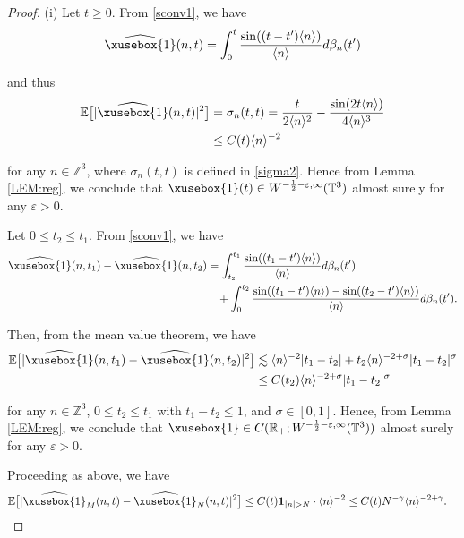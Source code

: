 \documentclass[%
11pt,  reqno]{amsart}
\def\<#1>{\xusebox{#1}}
\newcommand{\1}{\hspace{0.2mm}\text{I}\hspace{0.2mm}}
\newcommand{\noi}{\noindent}
\newcommand{\Z}{\mathbb{Z}}
\newcommand{\R}{\mathbb{R}}
\newcommand{\T}{\mathbb{T}}
\newcommand{\E}{\mathbb{E}}
\newcommand{\be}{\beta}
\newcommand{\eps}{\varepsilon}
\newcommand{\g}{\gamma}
\newcommand{\s}{\sigma}
\newcommand{\ft}{\widehat}
\newcommand{\les}{\lesssim}
\newcommand{\jb}[1]
{\langle #1 \rangle}
\newcommand{\ind}{\mathbf 1}
\numberwithin{equation}{section}
\numberwithin{theorem}{section}
\begin{document}
\begin{proof}
(i) 
Let $t \geq 0$.
From \eqref{sconv1}, we have
\begin{align}
\ft{\<1>}(n, t)   = 
   \int_0^t \frac{\sin ((t - t') \jb{ n })}{\jb{ n }} d \beta_n (t')
\label{sconv2}
\end{align}

\noi
and thus
\begin{align}
\begin{split}
\E\big[|\ft{\<1>}(n, t)|^2\big] 
& = \s_n(t, t) %
= \frac{t}{2\jb{n}^2} - \frac{\sin(2t \jb{n})}{4\jb{n}^3}\\
& \leq C(t) \jb{n}^{-2}
\end{split}
\label{sconv3}
\end{align}

\noi
for any $n \in \Z^3$, where $\s_n(t, t)$ is defined in \eqref{sigma2}.
Hence from Lemma \ref{LEM:reg}, 
we conclude that 
 $\<1>(t) \in W^{-\frac12 -\eps, \infty}(\T^3)$
 almost surely for any $\eps >0$.


Let  $0 \leq t_2 \leq t_1$. 
From \eqref{sconv1},  we have
\begin{align}
\begin{split}
\ft{\<1>}(n, t_1) - \ft{\<1>}(n, t_2)
& = \int_{t_2}^{t_1}
\frac{\sin((t_1 - t')\jb{n})}{\jb{n}}d\be_n(t')\\
& \hphantom{X}
+ \int_0^{t_2} 
\frac{\sin((t_1 - t')\jb{n}) - \sin((t_2 - t')\jb{n})}{\jb{n}} d\be_n(t').
\end{split}
\label{V0}
\end{align}

\noi
Then, from the mean value theorem,  we have
\begin{align}
\begin{split}
\E\big[|\ft{\<1>}(n, t_1) - \ft{\<1>}(n, t_2)|^2\big] 
& \les \jb{n}^{-2}|t_1 - t_2|
+ t_2 \jb{n}^{-2 + \s} |t_1 - t_2|^\s \\
& \leq C(t_2) \jb{n}^{-2 + \s} |t_1 - t_2|^\s
\end{split}
\label{V0a}
\end{align}

\noi
for any $n \in \Z^3$,   $0 \leq t_2 \leq t_1$ with $t_1 - t_2 \leq 1$, and  $\s \in [0, 1]$.
Hence, from Lemma \ref{LEM:reg}, 
we conclude that
 $\<1> \in C(\R_+; W^{-\frac12 -\eps, \infty}(\T^3))$
 almost surely
  for any $\eps > 0$.

Proceeding as above, we have
\begin{align*}
\E\big[|\ft{\<1>}_M(n, t) - \ft{\<1>}_N(n, t)|^2\big] 
& \leq C(t) \ind_{|n|> N} \cdot \jb{n}^{-2}
 \leq C(t) N^{-\g} \jb{n}^{-2+\g}.
\end{align*}



\end{proof}
\end{document}
